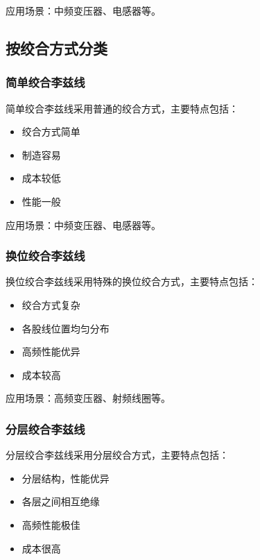 \documentclass[12pt,UTF8]{ctexbook}
\begin{document}
应用场景：中频变压器、电感器等。

\subsection{按绞合方式分类}

\subsubsection{简单绞合李兹线}

简单绞合李兹线采用普通的绞合方式，主要特点包括：

\begin{itemize}[leftmargin=2cm]
    \item 绞合方式简单
    \item 制造容易
    \item 成本较低
    \item 性能一般
\end{itemize}

应用场景：中频变压器、电感器等。

\subsubsection{换位绞合李兹线}

换位绞合李兹线采用特殊的换位绞合方式，主要特点包括：

\begin{itemize}[leftmargin=2cm]
    \item 绞合方式复杂
    \item 各股线位置均匀分布
    \item 高频性能优异
    \item 成本较高
\end{itemize}

应用场景：高频变压器、射频线圈等。

\subsubsection{分层绞合李兹线}

分层绞合李兹线采用分层绞合方式，主要特点包括：

\begin{itemize}[leftmargin=2cm]
    \item 分层结构，性能优异
    \item 各层之间相互绝缘
    \item 高频性能极佳
    \item 成本很高
\end{itemize}
\end{document}
